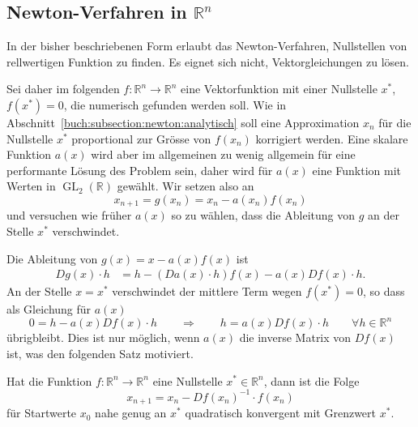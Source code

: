 %
%
\subsection{Newton-Verfahren in $\mathbb R^n$}
In der bisher beschriebenen Form erlaubt das Newton-Verfahren, 
Nullstellen von rellwertigen Funktion zu finden.
Es eignet sich nicht, Vektorgleichungen zu lösen.

Sei daher im folgenden $f\colon \mathbb R^n \to \mathbb R^n$ eine
Vektorfunktion mit einer Nullstelle $x^*$, $f(x^*)=0$, die numerisch gefunden 
werden soll.
Wie in Abschnitt~\ref{buch:subsection:newton:analytisch} soll eine
Approximation $x_n$ für die Nullstelle $x^*$ proportional zur Grösse
von $f(x_n)$ korrigiert werden.
Eine skalare Funktion $a(x)$ wird aber im allgemeinen zu wenig
allgemein für eine performante Lösung des Problem sein, daher
wird für $a(x)$ eine Funktion mit Werten in $\operatorname{GL}_2(\mathbb R)$
gewählt.
Wir setzen also an
\[
x_{n+1} = g(x_n) = x_n - a(x_n) f(x_n)
\]
und versuchen wie früher $a(x)$ so zu wählen, dass die Ableitung von $g$
an der Stelle $x^*$ verschwindet.

Die Ableitung von $g(x)=x-a(x)f(x)$ ist
\begin{align*}
Dg(x) \cdot h
&=
h - (Da(x)\cdot h) f(x) - a(x) Df(x)\cdot h.
\end{align*}
An der Stelle $x=x^*$ verschwindet der mittlere Term wegen $f(x^*)=0$, so
dass als Gleichung für $a(x)$
\[
0=h-a(x) Df(x) \cdot h
\qquad\Rightarrow\qquad
h = a(x) Df(x) \cdot h\qquad \forall h\in\mathbb R^n
\]
übrigbleibt.
Dies ist nur möglich, wenn $a(x)$ die inverse Matrix von $Df(x)$ ist,
was den folgenden Satz motiviert.

\begin{satz}
Hat die Funktion $f\colon\mathbb R^n\to\mathbb R^n$ eine Nullstelle
$x^*\in\mathbb R^n$, dann ist die Folge 
\[
x_{n+1} = x_n - Df(x_n)^{-1}\cdot f(x_n)
\]
für Startwerte $x_0$ nahe genug an $x^*$ quadratisch konvergent mit
Grenzwert $x^*$.
\end{satz}

